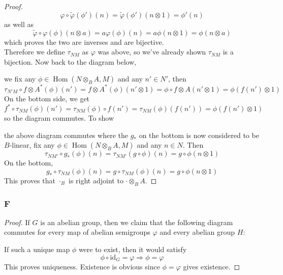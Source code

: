\documentclass{article}
\newcommand{\id}{\mathrm{id}}
\DeclareMathOperator{\Hom}{Hom}
\begin{document}
\begin{proof}
    \[
    \varphi \circ \tilde \varphi(\phi')(n)=\tilde \varphi(\phi')(n\otimes 1)=\phi'(n)
    \]
    as well as
    \[
    \tilde \varphi \circ \varphi(\phi)(n\otimes a)=a\varphi(\phi)(n)=a\phi(n\otimes 1)=\phi(n\otimes a)
    \]
    which proves the two are inverses and are bijective.\\
    \newline
    Therefore we define $\tau_{NM}$ as $\varphi$ was above, so we've already shown $\tau_{NM}$ is a bijection. Now back to the diagram below,
    \begin{center}
    \end{center}
    we fix any $\phi\in \Hom(N\otimes_B A,M)$ and any $n'\in N'$, then
    \[
    \tau_{N'M}\circ f\otimes A^*(\phi)(n')=f\otimes A^*(\phi)(n'\otimes 1)=\phi \circ f\otimes A(n'\otimes 1)=\phi(f(n')\otimes 1)
    \]
    On the bottom side, we get
    \[
    f^*\circ \tau_{NM}(\phi)(n')=\tau_{NM}(\phi)\circ f(n')=\tau_{NM}(\phi)(f(n'))=\phi(f(n')\otimes 1)
    \]
    so the diagram commutes. To show
\begin{center}
    \end{center}
    the above diagram commutes where the $g_*$ on the bottom is now considered to be $B$-linear, fix any $\phi\in \Hom(N\otimes_B A,M)$ and any $n\in N$. Then
    \[
    \tau_{NM'}\circ g_*(\phi)(n)=\tau_{NM'}(g\circ \phi)(n)=g\circ \phi(n\otimes 1)
    \]
    On the bottom,
    \[
    g_*\circ \tau_{NM}(\phi)(n)=g\circ \tau_{NM}(\phi)(n)=g\circ \phi(n\otimes 1)
    \]
    This proves that $\cdot_B$ is right adjoint to $\cdot \otimes_B A$.
\end{proof}
\subsubsection{F}\label{1.5.F}
\begin{proof}
    If $G$ is an abelian group, then we claim that the following diagram commutes for every map of abelian semigroups $\varphi$ and every abelian group $H$:
    \begin{center}
    \end{center}
    If such a unique map $\phi$ were to exist, then it would satisfy
    \[
    \phi \circ \id_G=\varphi \Rightarrow \phi=\varphi
    \]
    This proves uniqueness. Existence is obvious since $\phi=\varphi$ gives existence.
\end{proof}
\end{document}
